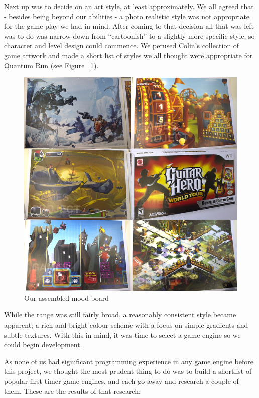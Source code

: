 \documentclass[a4paper,oneside]{memoir}
\begin{document}
		Next up was to decide on an art style, at least approximately. 
		We all agreed that - besides being beyond our abilities - a photo realistic style was not appropriate for the game play we had in mind. 
		After coming to that decision all that was left was to do was narrow down from ``cartoonish'' to a slightly more specific style, so character and level design could commence.
		We perused Colin's collection of game artwork and made a short list of styles we all thought were appropriate for Quantum Run (see Figure ~\ref{fig:MoodBoard}).

		\begin{figure}[ht]
			\begin{center}
				\includegraphics[width=120mm]{"../Screenshots/Early Research/mood-board"}
				\caption{Our assembled mood board}
				\label{fig:MoodBoard}
			\end{center}
		\end{figure}

		While the range was still fairly broad, a reasonably consistent style became apparent; a rich and bright colour scheme with a focus on simple gradients and subtle textures.
		With this in mind, it was time to select a game engine so we could begin development.
		
		As none of us had significant programming experience in any game engine before this project, we thought the most prudent thing to do was to build a shortlist of popular first timer game engines, and each go away and research a couple of them. These are the results of that research:
\end{document}
